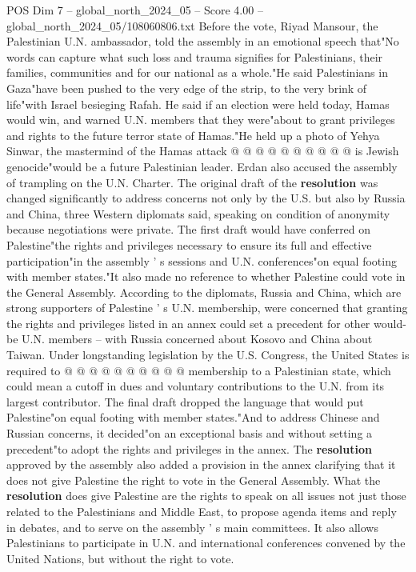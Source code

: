 \begin{textsample}{POS Dim 7 – global\_north\_2024\_05 – Score 4.00 – global\_north\_2024\_05/108060806.txt}
Before the vote, Riyad Mansour, the Palestinian U.N. ambassador, told the assembly in an emotional speech that"No words can capture what such loss and trauma signifies for Palestinians, their families, communities and for our national as a whole."He said Palestinians in Gaza"have been pushed to the very edge of the strip, to the very brink of life"with Israel besieging Rafah.
He said if an election were held today, Hamas would win, and warned U.N. members that they were"about to grant privileges and rights to the future terror state of Hamas."He held up a photo of Yehya Sinwar, the mastermind of the Hamas attack @ @ @ @ @ @ @ @ @ @ is Jewish genocide"would be a future Palestinian leader.
Erdan also accused the assembly of trampling on the U.N.
Charter.
The original draft of the \textbf{resolution} was changed significantly to address concerns not only by the U.S. but also by Russia and China, three Western diplomats said, speaking on condition of anonymity because negotiations were private.
The first draft would have conferred on Palestine"the rights and privileges necessary to ensure its full and effective participation"in the assembly ' s sessions and U.N. conferences"on equal footing with member states."It also made no reference to whether Palestine could vote in the General Assembly.
According to the diplomats, Russia and China, which are strong supporters of Palestine ' s U.N. membership, were concerned that granting the rights and privileges listed in an annex could set a precedent for other would-be U.N. members -- with Russia concerned about Kosovo and China about Taiwan.
Under longstanding legislation by the U.S.
Congress, the United States is required to @ @ @ @ @ @ @ @ @ @ membership to a Palestinian state, which could mean a cutoff in dues and voluntary contributions to the U.N. from its largest contributor.
The final draft dropped the language that would put Palestine"on equal footing with member states."And to address Chinese and Russian concerns, it decided"on an exceptional basis and without setting a precedent"to adopt the rights and privileges in the annex.
The \textbf{resolution} approved by the assembly also added a provision in the annex clarifying that it does not give Palestine the right to vote in the General Assembly.
What the \textbf{resolution} does give Palestine are the rights to speak on all issues not just those related to the Palestinians and Middle East, to propose agenda items and reply in debates, and to serve on the assembly ' s main committees.
It also allows Palestinians to participate in U.N. and international conferences convened by the United Nations, but without the right to vote.

\end{textsample}

